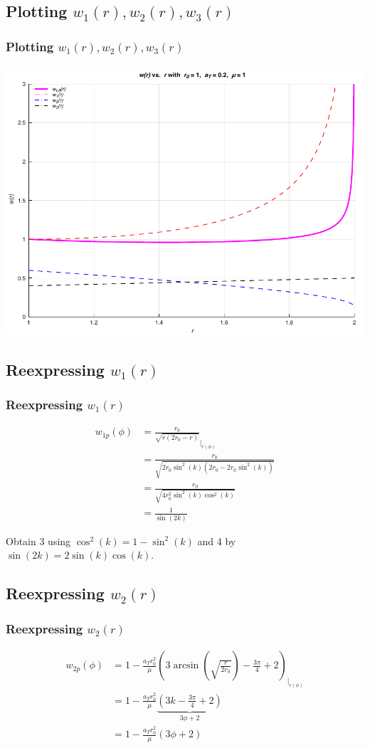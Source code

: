 \documentclass{beamer}
\newcommand{\sectit}[1]{
    \section{\texorpdfstring{#1}{}}
    \frametitle{#1}
}
\begin{document}
\begin{frame}
    \sectit{Plotting $w_1(r),w_2(r),w_3(r)$}

    \begin{center}
        \includegraphics[scale=0.7]{plots/partA_r.pdf}
    \end{center}
\end{frame}

\begin{frame}
    \sectit{Reexpressing $w_1(r)$}

    \begin{align}
        w_{1p}(\phi)&=\frac{r_{0}}{\sqrt{r\left(2 r_{0}-r\right)}}_{\big\rvert_{r(\phi)}}\\
        &=\frac{r_0}{\sqrt{2r_0\sin^2(k)(2r_0-2r_0\sin^2(k))}}\\
        &=\frac{r_0}{\sqrt{4r_0^2\sin^2(k)\cos^2(k)}}\\
        &=\frac{1}{\sin(2k)}
    \end{align}

    Obtain 3 using $\cos^2(k)=1-\sin^2(k)$ and 4 by $\sin(2k)=2\sin(k)\cos(k)$.
    
\end{frame}

\begin{frame}
    \sectit{Reexpressing $w_2(r)$}

    \begin{align}
        w_{2p}(\phi)&=1-\frac{a_Tr_0^2}{\mu}\left(3\arcsin(\sqrt{\frac{r}{2r_0}})-\frac{3\pi}{4}+2\right)_{\big\rvert_{r(\phi)}}\\
        &=1-\frac{a_Tr_0^2}{\mu}\underbrace{\left(3k-\frac{3\pi}{4}+2\right)}_{3\phi + 2}\\
        &=1-\frac{a_Tr_0^2}{\mu}\left(3\phi+2\right)
    \end{align}
\end{frame}
\end{document}

